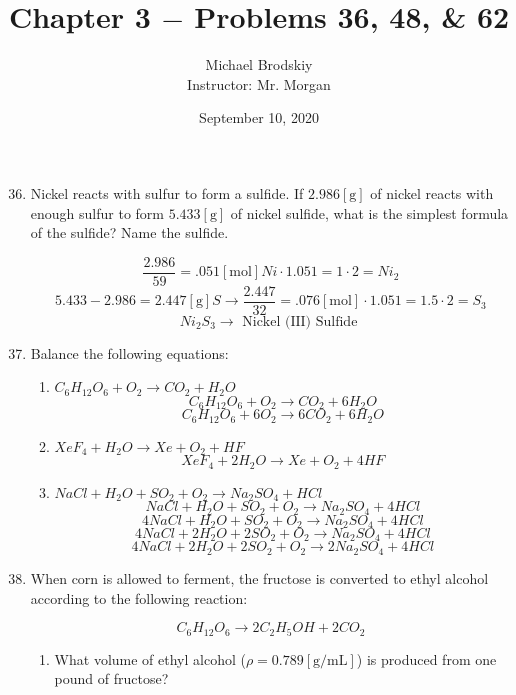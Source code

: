 \documentclass[12pt]{article}
\title{Chapter 3 $-$ Problems 36, 48, \& 62}
\date{September 10, 2020}
\author{Michael Brodskiy\\ \small Instructor: Mr. Morgan}
\begin{document}
\maketitle

\begin{enumerate}
    \setcounter{enumi}{35}

  \item Nickel reacts with sulfur to form a sulfide. If $2.986[\si{\gram}]$ of nickel reacts with enough sulfur to form $5.433[\si{\gram}]$ of nickel sulfide, what is the simplest formula of the sulfide? Name the sulfide.

    $$\frac{2.986}{59}=.051[\si{\mole}]Ni\cdot{1}{.051}=1\cdot2=Ni_2$$
    $$5.433-2.986=2.447[\si{\gram}]S\rightarrow\frac{2.447}{32}=.076[\si{\mol}]\cdot{1}{.051}=1.5\cdot2=S_3$$
    $$Ni_2S_3\rightarrow\text{ Nickel (III) Sulfide }$$

    \setcounter{enumi}{47}

  \item Balance the following equations:

    \begin{enumerate}

      \item $C_6H_{12}O_6+O_2\rightarrow CO_2+H_2O$
       $$C_6H_{12}O_6+O_2\rightarrow CO_2+6H_2O$$
       $$C_6H_{12}O_6+6O_2\rightarrow 6CO_2+6H_2O$$

     \item $XeF_4+H_2O\rightarrow Xe+O_2+HF$
      $$XeF_4+2H_2O\rightarrow Xe+O_2+4HF$$

    \item $NaCl+H_2O+SO_2+O_2\rightarrow Na_2SO_4 + HCl$
     $$NaCl+H_2O+SO_2+O_2\rightarrow Na_2SO_4 + 4HCl$$
     $$4NaCl+H_2O+SO_2+O_2\rightarrow Na_2SO_4 + 4HCl$$
     $$4NaCl+2H_2O+2SO_2+O_2\rightarrow Na_2SO_4 + 4HCl$$
     $$4NaCl+2H_2O+2SO_2+O_2\rightarrow 2Na_2SO_4 + 4HCl$$

    \end{enumerate}

    \setcounter{enumi}{61}

  \item When corn is allowed to ferment, the fructose is converted to ethyl alcohol according to the following reaction:

    $$C_6H_12O_6\rightarrow 2C_2H_5OH+2CO_2$$

    \begin{enumerate}

      \item What volume of ethyl alcohol ($\rho=0.789[\si{\gram\per\milli\liter}]$) is produced from one pound of fructose?


\end{enumerate}
\end{enumerate}
\end{document}
